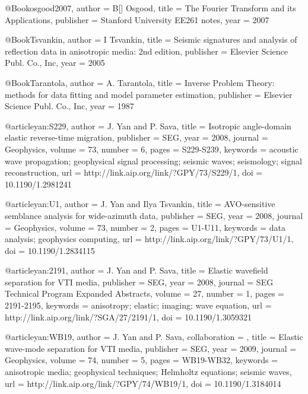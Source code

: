 @Book{osgood2007,
  author =	 {B[] Osgood},
  title =	 {The {F}ourier Transform and its Applications},
  publisher =	 {Stanford University EE261 notes},
  year =	 2007
}

@Book{Tsvankin,
  author =	 {I Tsvankin},
  title =	 {Seismic signatures and analysis of reflection data
                  in anisotropic media: 2nd edition},
  publisher =	 {Elsevier Science Publ. Co., Inc},
  year =	 2005
}

@Book{Tarantola,
  author = 	 {A. Tarantola},
  title = 	 {Inverse {P}roblem {T}heory: methods for data
                 fitting and model parameter estimation},
  publisher = 	 {Elsevier Science Publ. Co., Inc},
  year = 	 1987
}

@article{yan:S229,
  author =	 {J. Yan and P. Sava},
  title =	 {Isotropic angle-domain elastic reverse-time
                  migration},
  publisher =	 {SEG},
  year =	 2008,
  journal =	 {Geophysics},
  volume =	 73,
  number =	 6,
  pages =	 {S229-S239},
  keywords =	 {acoustic wave propagation; geophysical signal
                  processing; seismic waves; seismology; signal
                  reconstruction},
  url =		 {http://link.aip.org/link/?GPY/73/S229/1},
  doi =		 {10.1190/1.2981241}
}

@article{yan:U1,
  author =	 {J. Yan and Ilya Tsvankin},
  title =	 {AVO-sensitive semblance analysis for wide-azimuth
                  data},
  publisher =	 {SEG},
  year =	 2008,
  journal =	 {Geophysics},
  volume =	 73,
  number =	 2,
  pages =	 {U1-U11},
  keywords =	 {data analysis; geophysics computing},
  url =		 {http://link.aip.org/link/?GPY/73/U1/1},
  doi =		 {10.1190/1.2834115}
}

@article{yan:2191,
  author =	 {J. Yan and P. Sava},
  title =	 {Elastic wavefield separation for {VTI} media},
  publisher =	 {SEG},
  year =	 2008,
  journal =	 {SEG Technical Program Expanded Abstracts},
  volume =	 27,
  number =	 1,
  pages =	 {2191-2195},
  keywords =	 {anisotropy; elastic; imaging; wave equation},
  url =		 {http://link.aip.org/link/?SGA/27/2191/1},
  doi =		 {10.1190/1.3059321}
}




@article{yan:WB19,
author = {J. Yan and P. Sava},
collaboration = {},
title = {Elastic wave-mode separation for {VTI} media},
publisher = {SEG},
year = {2009},
journal = {Geophysics},
volume = {74},
number = {5},
pages = {WB19-WB32},
keywords = {anisotropic media; geophysical techniques; Helmholtz equations; seismic waves},
url = {http://link.aip.org/link/?GPY/74/WB19/1},
doi = {10.1190/1.3184014}
}





